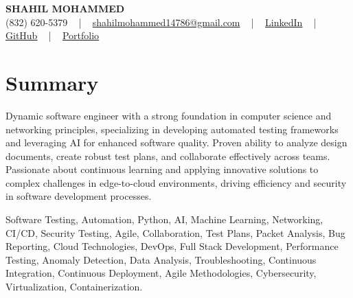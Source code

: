 \documentclass[letterpaper,10pt]{article}
\begin{document}
\begin{center}
    {\fontsize{14pt}{12pt}\selectfont \textbf{\MakeUppercase{Shahil Mohammed}}}\\ \vspace{2pt}
    \fontsize{10pt}{12pt}\selectfont (832) 620-5379 ~ | ~ \href{mailto:shahilmohammed14786@gmail.com}{shahilmohammed14786@gmail.com} ~ | ~  
    \href{https://www.linkedin.com/in/shahil-mohammed-9652931a1/}{\color{blue}\underline{LinkedIn}}  ~ | ~ 
    \href{https://github.com/freakbeast14}{\color{blue}\underline{GitHub}} ~ | ~ 
    \href{https://shahil-mohammed.netlify.app/}{\color{blue}\underline{Portfolio}}
    \vspace{-8pt}
\end{center}

\section{Summary}
\vspace{-2pt}\fontsize{8pt}{9pt}\selectfont
Dynamic software engineer with a strong foundation in computer science and networking principles, specializing in developing automated testing frameworks and leveraging AI for enhanced software quality. Proven ability to analyze design documents, create robust test plans, and collaborate effectively across teams. Passionate about continuous learning and applying innovative solutions to complex challenges in edge-to-cloud environments, driving efficiency and security in software development processes.
 \vspace{-5pt}
 
{\fontsize{1pt}{1pt}\selectfont\color{white}
Software Testing, Automation, Python, AI, Machine Learning, Networking, CI/CD, Security Testing, Agile, Collaboration, Test Plans, Packet Analysis, Bug Reporting, Cloud Technologies, DevOps, Full Stack Development, Performance Testing, Anomaly Detection, Data Analysis, Troubleshooting, Continuous Integration, Continuous Deployment, Agile Methodologies, Cybersecurity, Virtualization, Containerization.
}
\vspace{-8pt}

\vspace{-2pt}
\end{document}
